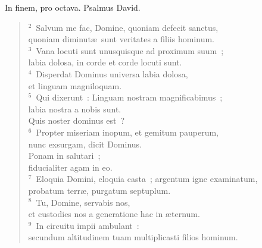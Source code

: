 \lettrine[lines=3,image=true,loversize=0.05,lraise=-0.03]{I}{}n finem, pro octava. Psalmus David.
\begin{flushleft}\begin{verse}\vspace{6pt}${}^{2}$~Salvum me fac, Domine, quoniam defecit sanctus,\\ quoniam diminut\ae\ sunt veritates a filiis hominum.\\
${}^{3}$~Vana locuti sunt unusquisque ad proximum suum~;\\ labia dolosa, in corde et corde locuti sunt.\\
${}^{4}$~Disperdat Dominus universa labia dolosa,\\ et linguam magniloquam.\\
${}^{5}$~Qui dixerunt~: Linguam nostram magnificabimus~;\\ labia nostra a nobis sunt.\\ Quis noster dominus est~?\\
${}^{6}$~Propter miseriam inopum, et gemitum pauperum,\\ nunc exsurgam, dicit Dominus.\\ Ponam in salutari~;\\ fiducialiter agam in eo.\\
${}^{7}$~Eloquia Domini, eloquia casta~; argentum igne examinatum,\\ probatum terr\ae , purgatum septuplum.\\
${}^{8}$~Tu, Domine, servabis nos,\\ et custodies nos a generatione hac in \ae ternum.\\
${}^{9}$~In circuitu impii ambulant~:\\ secundum altitudinem tuam multiplicasti filios hominum.\end{verse}\end{flushleft}



